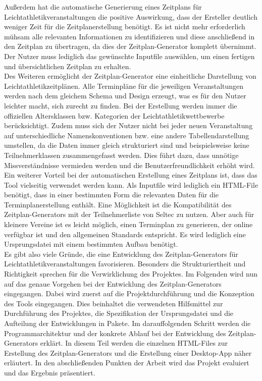 Außerdem hat die automatische Generierung eines Zeitplans für Leichtathletikveranstaltungen die positive Auswirkung, dass der Ersteller deutlich weniger Zeit für die Zeitplanerstellung benötigt. Es ist nicht mehr erforderlich mühsam alle relevanten Informationen zu identifizieren und diese anschließend in den Zeitplan zu übertragen, da dies der Zeitplan-Generator komplett übernimmt. Der Nutzer muss lediglich das gewünschte Inputfile auswählen, um einen fertigen und übersichtlichen Zeitplan zu erhalten. \\
Des Weiteren ermöglicht der Zeitplan-Generator eine einheitliche Darstellung von Leichtathletikzeitplänen. Alle Terminpläne für die jeweiligen Veranstaltungen werden nach dem gleichem Schema und Design erzeugt, was es für den Nutzer leichter macht, sich zurecht zu finden. Bei der Erstellung werden immer die offiziellen Altersklassen bzw. Kategorien der Leichtathletikwettbewerbe berücksichtigt. Zudem muss sich der Nutzer nicht bei jeder neuen Veranstaltung auf unterschiedliche Namenskonventionen bzw. eine andere Tabellendarstellung umstellen, da die Daten immer gleich strukturiert sind und beispielsweise keine Teilnehmerklassen zusammengefasst werden. Dies führt dazu, dass unnötige Missverständnisse vermieden werden und die Benutzerfreundlichkeit erhöht wird.\\
Ein weiterer Vorteil bei der automatischen Erstellung eines Zeitplans ist, dass das Tool vielseitig verwendet werden kann. Als Inputfile wird lediglich ein HTML-File benötigt, dass in einer bestimmten Form die relevanten Daten für die Terminplanerstellung enthält. Eine Möglichkeit ist die Kompatibilität des Zeitplan-Generators mit der Teilnehmerliste von Seltec zu nutzen. Aber auch für kleinere Vereine ist es leicht möglich, einen Terminplan zu generieren, der online verfügbar ist und den allgemeinen Standards entspricht. Es wird lediglich eine Ursprungsdatei mit einem bestimmten Aufbau benötigt.\\
Es gibt also viele Gründe, die eine Entwicklung des Zeitplan-Generators für Leichtathletikveranstaltungen favorisieren. Besonders die Strukturiertheit und Richtigkeit sprechen für die Verwirklichung des Projektes. Im Folgenden wird nun auf das genaue Vorgehen bei der Entwicklung des Zeitplan-Generators eingegangen. Dabei wird zuerst auf die Projektdurchführung und die Konzeption des Tools eingegangen. Dies beinhaltet die verwendeten Hilfsmittel zur Durchführung des Projektes, die Spezifikation der Ursprungsdatei und die Aufteilung der Entwicklungen in Pakete. Im darauffolgenden Schritt werden die Programmarchitektur und der konkrete Ablauf bei der Entwicklung des Zeitplan-Generators erklärt. In diesem Teil werden die einzelnen HTML-Files zur Erstellung des Zeitplan-Generators und die Erstellung einer Desktop-App näher erläutert. In den abschließenden Punkten der Arbeit wird das Projekt evaluiert und das Ergebnis präsentiert.


